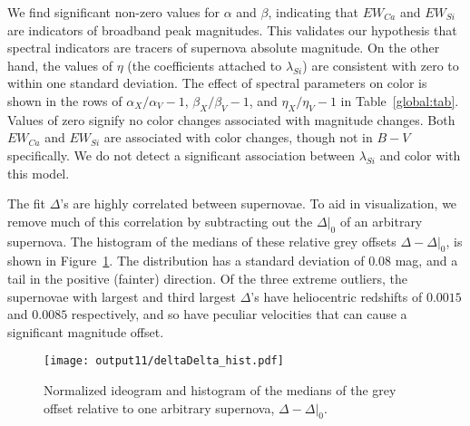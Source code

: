 \documentclass{aastex61}   	%
\begin{document}
We find significant non-zero values for $\alpha$ and $\beta$, indicating that $EW_{Ca}$ and $EW_{Si}$ are indicators of broadband
peak magnitudes.
This validates our hypothesis that spectral indicators
are tracers of supernova absolute magnitude.  On the other hand, the values of $\eta$ (the coefficients attached to $\lambda_{Si}$) are consistent with zero
to  within one standard deviation.
The effect of spectral parameters on color is shown in the rows of $\alpha_X/\alpha_V-1$,  $\beta_X/\beta_V-1$, and  $\eta_X/\eta_V-1$
in Table~\ref{global:tab}.
Values of zero signify no color changes associated with magnitude changes.
Both $EW_{Ca}$ and $EW_{Si}$ are associated with color changes, though not in $B-V$ specifically.
We do not detect a significant association between
$\lambda_{Si}$ and color with this model.

\color{purple}
The fit $\Delta$'s are highly correlated between supernovae.  To aid in visualization, we remove much of this
correlation by subtracting out the $\Delta|_0$ of  an arbitrary supernova.
The histogram of the medians of these relative  grey offsets $\Delta-\Delta|_0$,
is shown in Figure~\ref{hist:fig}.  The distribution
has a standard deviation of
$0.08$
mag, and a tail in the positive (fainter) direction. 
Of the three extreme outliers, the supernovae with largest and third largest $\Delta$'s have  heliocentric redshifts of 
 $0.0015$ and $0.0085$ respectively, and so have peculiar velocities that can cause a significant magnitude offset.
\color{black}
\begin{figure}[htbp] %
   \centering
   \texttt{[image: output11/deltaDelta\_hist.pdf]} 
   \caption{
   \color{purple}
   Normalized ideogram and histogram of the medians of the grey offset relative to one arbitrary supernova, $\Delta-\Delta|_0$.  
   \color{black}
   \label{hist:fig}}
\end{figure}
\end{document}

